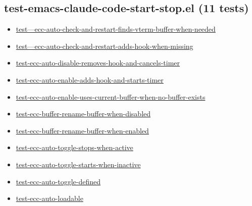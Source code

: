 \documentclass[11pt]{article}
\begin{document}
\subsection{test-emacs-claude-code-start-stop.el (11 tests)}
\label{sec:orga04211a}
\begin{itemize}
\item \href{test-emacs-claude-code-start-stop.el}{test---ecc-auto-check-and-restart-finds-vterm-buffer-when-needed}
\item \href{test-emacs-claude-code-start-stop.el}{test---ecc-auto-check-and-restart-adds-hook-when-missing}
\item \href{test-emacs-claude-code-start-stop.el}{test-ecc-auto-disable-removes-hook-and-cancels-timer}
\item \href{test-emacs-claude-code-start-stop.el}{test-ecc-auto-enable-adds-hook-and-starts-timer}
\item \href{test-emacs-claude-code-start-stop.el}{test-ecc-auto-enable-uses-current-buffer-when-no-buffer-exists}
\item \href{test-emacs-claude-code-start-stop.el}{test-ecc-buffer-rename-buffer-when-disabled}
\item \href{test-emacs-claude-code-start-stop.el}{test-ecc-buffer-rename-buffer-when-enabled}
\item \href{test-emacs-claude-code-start-stop.el}{test-ecc-auto-toggle-stops-when-active}
\item \href{test-emacs-claude-code-start-stop.el}{test-ecc-auto-toggle-starts-when-inactive}
\item \href{test-emacs-claude-code-start-stop.el}{test-ecc-auto-toggle-defined}
\item \href{test-emacs-claude-code-start-stop.el}{test-ecc-auto-loadable}
\end{itemize}
\end{document}
